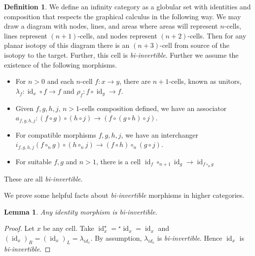 \documentclass{article}
\newtheorem{lemma}{Lemma}
\theoremstyle{definition}
\newtheorem{definition}{Definition}
\theoremstyle{examplestyle}
\DeclareMathOperator{\id}{id}
\newcommand{\linv}[1]{{}^\star\!#1}
\newcommand{\rinv}[1]{#1^\star}
\begin{document}
\begin{definition}
  \label{def:higher-cat}
  We define an infinity category as a globular set with identities and composition that respects the graphical calculus in the following way. We may draw a diagram with nodes, lines, and areas where areas will represent \(n\)-cells, lines represent \((n+1)\)-cells, and nodes represent \((n+2)\)-cells. Then for any planar isotopy of this diagram there is an \((n+3)\)-cell from source of the isotopy to the target. Further, this cell is \emph{bi-invertible}. Further we assume the existence of the following morphisms.
  \begin{itemize}
  \item For \(n>0\) and each \(n\)-cell \(f: x \to y\), there are \(n+1\)-cells, known as unitors, \(\lambda_f: \id_x \circ f \to f\) and \(\rho_f: f \circ \id_y \to f\).
  \item Given \(f,g,h,j\), \(n>1\)-cells composition defined, we have an associator \(a_{f,g,h,j} : (f \circ g) \circ (h \circ j) \to (f \circ (g \circ h) \circ j)\).
  \item For compatible morphisms \(f,g,h,j\), we have an interchanger \(i_{f,g,h,j}(f \circ_n g) \circ (h \circ_n j) \to (f \circ h) \circ_n (g \circ j)\).
  \item For suitable \(f,g\) and \(n > 1\), there is a cell \(\id_f \circ_{n+1} \id_g \to \id_{f \circ_n g}\)
  \end{itemize}
  These are all \emph{bi-invertible}.
\end{definition}

We prove some helpful facts about \emph{bi-invertible} morphisms in higher categories.

\begin{lemma}
  \label{lem:identity}
  Any identity morphism is \emph{bi-invertible}.
\end{lemma}

\begin{proof}
  Let \(x\) be any cell. Take \(\rinv {\id_x} = \linv {\id_x} = \id_x\) and \((\id_x)_R = (\id_x)_L = \lambda_{id_x}\). By assumption, \(\lambda_{id_x}\) is \emph{bi-invertible}. Hence \(\id_x\) is \emph{bi-invertible}.
\end{proof}
\end{document}
